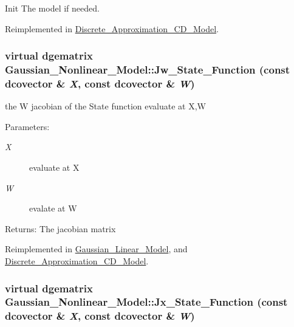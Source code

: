 Init The model if needed. 



Reimplemented in \hyperlink{class_discrete___approximation___c_d___model_0c4caaf9a2874a8e5219e72401caf908}{Discrete\_\-Approximation\_\-CD\_\-Model}.\hypertarget{class_gaussian___nonlinear___model_1c6710cedf6317e07b7b2a48f41f5442}{
\subsubsection[{Jw\_\-State\_\-Function}]{\setlength{\rightskip}{0pt plus 5cm}virtual dgematrix Gaussian\_\-Nonlinear\_\-Model::Jw\_\-State\_\-Function (const dcovector \& {\em X}, \/  const dcovector \& {\em W})}}
\label{class_gaussian___nonlinear___model_1c6710cedf6317e07b7b2a48f41f5442}


the W jacobian of the State function evaluate at X,W 

\begin{Desc}
\item[Parameters:]
\begin{description}
\item[{\em X}]evaluate at X \item[{\em W}]evalate at W\end{description}
\end{Desc}
\begin{Desc}
\item[Returns:]The jacobian matrix \end{Desc}


Reimplemented in \hyperlink{class_gaussian___linear___model_0df35cd7199676b9a03feec376aa49e7}{Gaussian\_\-Linear\_\-Model}, and \hyperlink{class_discrete___approximation___c_d___model_a5021c3ba6bd2cce5558a783843461ab}{Discrete\_\-Approximation\_\-CD\_\-Model}.\hypertarget{class_gaussian___nonlinear___model_ad4a587fcaab06d2d9e44d61cee814cf}{
\subsubsection[{Jx\_\-State\_\-Function}]{\setlength{\rightskip}{0pt plus 5cm}virtual dgematrix Gaussian\_\-Nonlinear\_\-Model::Jx\_\-State\_\-Function (const dcovector \& {\em X}, \/  const dcovector \& {\em W})}}
\label{class_gaussian___nonlinear___model_ad4a587fcaab06d2d9e44d61cee814cf}


